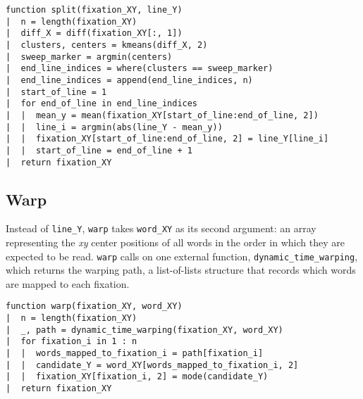\documentclass[doc,biblatex]{apa7}
\begin{document}
\begin{verbatim}
function split(fixation_XY, line_Y)
|  n = length(fixation_XY)
|  diff_X = diff(fixation_XY[:, 1])
|  clusters, centers = kmeans(diff_X, 2)
|  sweep_marker = argmin(centers)
|  end_line_indices = where(clusters == sweep_marker)
|  end_line_indices = append(end_line_indices, n)
|  start_of_line = 1
|  for end_of_line in end_line_indices
|  |  mean_y = mean(fixation_XY[start_of_line:end_of_line, 2])
|  |  line_i = argmin(abs(line_Y - mean_y))
|  |  fixation_XY[start_of_line:end_of_line, 2] = line_Y[line_i]
|  |  start_of_line = end_of_line + 1
|  return fixation_XY
\end{verbatim}

\subsection{Warp}

\noindent
Instead of \texttt{line\_Y}, \texttt{warp} takes \texttt{word\_XY} as its second argument: an array representing the \textit{xy} center positions of all words in the order in which they are expected to be read. \texttt{warp} calls on one external function, \texttt{dynamic\_time\_warping}, which returns the warping path, a list-of-lists structure that records which words are mapped to each fixation.

\begin{verbatim}
function warp(fixation_XY, word_XY)
|  n = length(fixation_XY)
|  _, path = dynamic_time_warping(fixation_XY, word_XY)
|  for fixation_i in 1 : n
|  |  words_mapped_to_fixation_i = path[fixation_i]
|  |  candidate_Y = word_XY[words_mapped_to_fixation_i, 2]
|  |  fixation_XY[fixation_i, 2] = mode(candidate_Y)
|  return fixation_XY
\end{verbatim}
\end{document}
